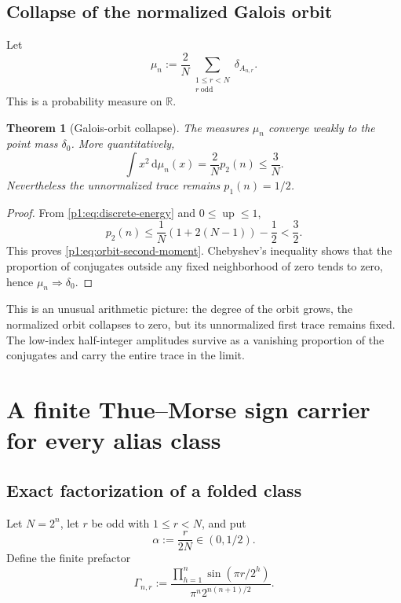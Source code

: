 \documentclass[11pt,oneside]{article}
\newtheorem{theorem}{Theorem}[section]
\theoremstyle{definition}
\theoremstyle{remark}
\newcommand{\R}{\mathbb R}
\newcommand{\Up}{\operatorname{up}}
\newcommand{\dd}{\,\mathrm d}
\begin{document}
\subsection{Collapse of the normalized Galois orbit}

Let
\begin{equation}\label{p1:eq:empirical-measure}
 \mu_n:=\frac2N
 \sum_{\substack{1\le r<N\\r\ \mathrm{odd}}}\delta_{A_{n,r}}.
\end{equation}
This is a probability measure on $\R$.

\begin{theorem}[Galois-orbit collapse]\label{p1:thm:orbit-collapse}
The measures $\mu_n$ converge weakly to the point mass $\delta_0$.  More
quantitatively,
\begin{equation}\label{p1:eq:orbit-second-moment}
 \int x^2\dd\mu_n(x)=\frac2N p_2(n)\le\frac3N.
\end{equation}
Nevertheless the unnormalized trace remains $p_1(n)=1/2$.
\end{theorem}

\begin{proof}
From \eqref{p1:eq:discrete-energy} and $0\le\Up\le1$,
\[
 p_2(n)\le\frac1N(1+2(N-1))-\frac12<\frac32.
\]
This proves \eqref{p1:eq:orbit-second-moment}.  Chebyshev's inequality shows that
the proportion of conjugates outside any fixed neighborhood of zero tends to
zero, hence $\mu_n\Rightarrow\delta_0$.
\end{proof}

\begin{remark}
This is an unusual arithmetic picture: the degree of the orbit grows, the
normalized orbit collapses to zero, but its unnormalized first trace remains
fixed.  The low-index half-integer amplitudes survive as a vanishing proportion
of the conjugates and carry the entire trace in the limit.
\end{remark}

\section{A finite Thue--Morse sign carrier for every alias class}\label{p1:sec:sign-carrier}

\subsection{Exact factorization of a folded class}

Let $N=2^n$, let $r$ be odd with $1\le r<N$, and put
\begin{equation}\label{p1:eq:a-shift}
 \alpha:=\frac{r}{2N}\in(0,1/2).
\end{equation}
Define the finite prefactor
\begin{equation}\label{p1:eq:Gamma-n-r}
 \Gamma_{n,r}:=
 \frac{\displaystyle\prod_{h=1}^{n}\sin(\pi r/2^h)}
      {\pi^n2^{n(n+1)/2}}.
\end{equation}
\end{document}
